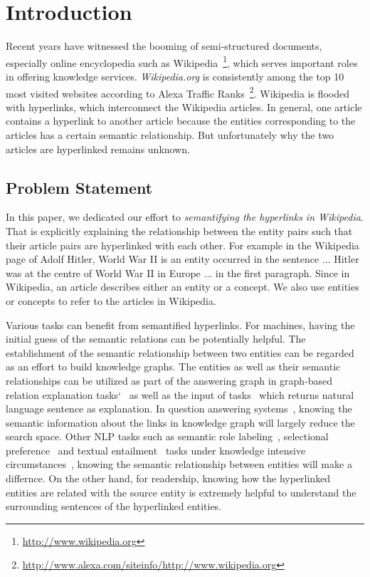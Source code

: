 \section{Introduction}
Recent years have witnessed the booming of semi-structured documents, especially online encyclopedia such as  Wikipedia~\footnote{\small\url{http://www.wikipedia.org}}, which serves important roles in offering knowledge services.
{\it Wikipedia.org} is consistently among the top 10 most visited websites according to Alexa Traffic Ranks~\footnote{\small\url{http://www.alexa.com/siteinfo/http://www.wikipedia.org}}.
Wikipedia is flooded with hyperlinks, which interconnect the Wikipedia articles.
In general, one article contains a hyperlink to another article because the entities corresponding to the articles has a certain semantic relationship.
But unfortunately why the two articles are hyperlinked remains unknown.

\subsection{Problem Statement}
In this paper, we dedicated our effort to {\it semantifying the hyperlinks in Wikipedia}.
That is explicitly explaining the relationship between the entity pairs such that their article pairs are hyperlinked with each other. 
For example in the Wikipedia page of \ac{Adolf Hitler}, \ac{World War II} is an entity occurred in the sentence \ac{... Hitler was at the centre of World War II in Europe ...} in the first paragraph.
Since in Wikipedia, an article describes either an entity or a concept. We also use entities or concepts to refer to the articles in Wikipedia. 

Various tasks can benefit from semantified hyperlinks.
For machines, having the initial guess of the semantic relations can be potentially helpful.
The establishment of the semantic relationship between two entities can be regarded as an effort to build knowledge graphs.
The entities as well as their semantic relationships can be utilized as part of the answering graph in graph-based relation explanation tasks`~\cite{fang2011rex} as well as the input of tasks~\cite{voskarideslearning} which returns natural language sentence as explanation.
In question answering systems~\cite{yang2014slq}, knowing the semantic information about the links in knowledge graph will largely reduce the search space.
Other NLP tasks such as semantic role labeling~\cite{palmer2010semantic}, selectional preference~\cite{pantel2007isp} and textual entailment~\cite{androutsopoulos2010survey} tasks under knowledge intensive circumstances~\cite{yao2012unsupervised,exner2011using}, knowing the semantic relationship between entities will make a differnce.
On the other hand, for readership, knowing how the hyperlinked entities are related with the source entity is extremely helpful to understand the surrounding sentences of the hyperlinked entities.

